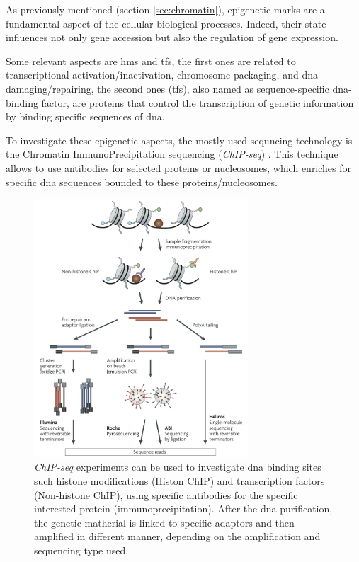 As previously mentioned (section \ref{sec:chromatin}), epigenetic marks are a fundamental aspect of the cellular biological processes. 
Indeed, their state influences not only gene accession but also the regulation of gene expression.

Some relevant aspects are \glspl{hm} and \glspl{tf}, the first ones are related to transcriptional activation/inactivation, chromosome packaging, and \gls{dna} damaging/repairing, the second ones (\glspl{tf}), also named as sequence-specific \gls{dna}-binding factor, are proteins that control the transcription of genetic information by binding specific sequences of \gls{dna}.

To investigate these epigenetic aspects, the mostly used sequncing technology is the Chromatin ImmunoPrecipitation sequencing (\textit{ChIP-seq}) \cite{Park2009}.
This technique allows to use antibodies for selected proteins or nucleosomes, which enriches for specific \gls{dna} sequences bounded to these proteins/nucleosomes.

\begin{figure}[H]
\centering
\includegraphics[width=8cm, keepaspectratio]{img/intro/chip.png}
\caption[ChIP-seq experiment]{\textit{ChIP-seq} experiments can be used to investigate \gls{dna} binding sites such histone modifications (Histon ChIP) and transcription factors (Non-histone ChIP), using specific antibodies for the specific interested protein (immunoprecipitation).
After the \gls{dna} purification, the genetic matherial is linked to specific adaptors and then amplified in different manner, depending on the amplification and sequencing type used. \cite{Park2009}}
\label{fig:chipseqexp}
\end{figure}


